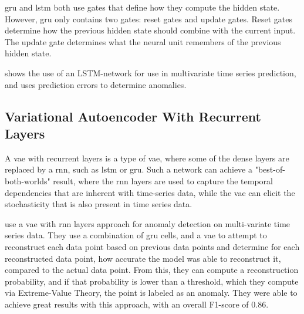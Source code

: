 \gls{gru} and \gls{lstm} both use gates that define how they compute the hidden state. However, \gls{gru} only contains two gates: reset gates and update gates. Reset gates determine how the previous hidden state should combine with the current input. The update gate determines what the neural unit remembers of the previous hidden state.\cite{lstm_gru_tutorial}

\cite{related_work_rnn} shows the use of an LSTM-network for use in multivariate time series prediction, and uses prediction errors to determine anomalies.

\subsection{Variational Autoencoder With Recurrent Layers}
A \gls{vae} with recurrent layers is a type of \gls{vae}, where some of the dense layers are replaced by a \gls{rnn}, such as \gls{lstm} or \gls{gru}. Such a network can achieve a "best-of-both-worlds" result, where the \gls{rnn} layers are used to capture the temporal dependencies that are inherent with time-series data, while the \gls{vae} can elicit the stochasticity that is also present in time series data.

\cite{kdd} use a \gls{vae} with \gls{rnn} layers approach for anomaly detection on multi-variate time series data. They use a combination of \gls{gru} cells, and a \gls{vae} to attempt to reconstruct each data point based on previous data points and determine for each reconstructed data point, how accurate the model was able to reconstruct it, compared to the actual data point. From this, they can compute a reconstruction probability, and if that probability is lower than a threshold, which they compute via Extreme-Value Theory, the point is labeled as an anomaly. They were able to achieve great results with this approach, with an overall F1-score of 0.86.